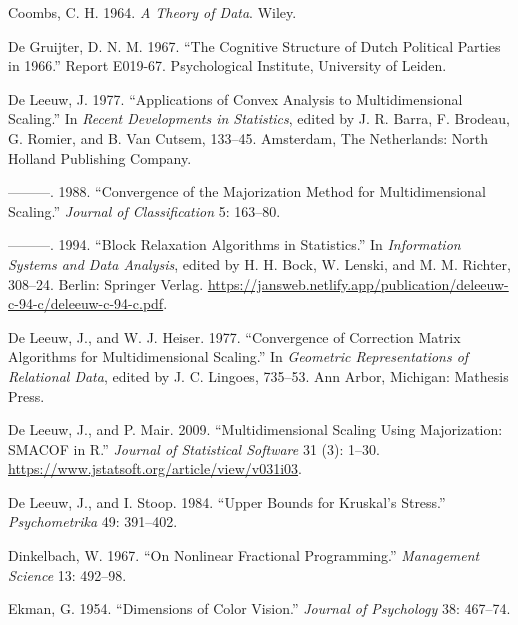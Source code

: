 \documentclass[
  12pt,
]{article}
\newlength{\cslhangindent}
\newenvironment{CSLReferences}[2] %
 {\begin{list}{}{%
  \setlength{\itemindent}{0pt}
  \setlength{\leftmargin}{0pt}
  \setlength{\parsep}{0pt}
  \ifodd #1
   \setlength{\leftmargin}{\cslhangindent}
   \setlength{\itemindent}{-1\cslhangindent}
  \fi
  \setlength{\itemsep}{#2\baselineskip}}}
 {\end{list}}
\theoremstyle{definition}
\theoremstyle{definition}
\theoremstyle{definition}
\theoremstyle{definition}
\theoremstyle{remark}
\begin{document}
\label{refs}
\begin{CSLReferences}{1}{0}
Coombs, C. H. 1964. \emph{{A Theory of Data}}. Wiley.

De Gruijter, D. N. M. 1967. {``{The Cognitive Structure of Dutch Political Parties in 1966}.''} Report E019-67. Psychological Institute, University of Leiden.

De Leeuw, J. 1977. {``Applications of Convex Analysis to Multidimensional Scaling.''} In \emph{Recent Developments in Statistics}, edited by J. R. Barra, F. Brodeau, G. Romier, and B. Van Cutsem, 133--45. Amsterdam, The Netherlands: North Holland Publishing Company.

---------. 1988. {``Convergence of the Majorization Method for Multidimensional Scaling.''} \emph{Journal of Classification} 5: 163--80.

---------. 1994. {``{Block Relaxation Algorithms in Statistics}.''} In \emph{Information Systems and Data Analysis}, edited by H. H. Bock, W. Lenski, and M. M. Richter, 308--24. Berlin: Springer Verlag. \url{https://jansweb.netlify.app/publication/deleeuw-c-94-c/deleeuw-c-94-c.pdf}.

De Leeuw, J., and W. J. Heiser. 1977. {``Convergence of Correction Matrix Algorithms for Multidimensional Scaling.''} In \emph{Geometric Representations of Relational Data}, edited by J. C. Lingoes, 735--53. Ann Arbor, Michigan: Mathesis Press.

De Leeuw, J., and P. Mair. 2009. {``{Multidimensional Scaling Using Majorization: SMACOF in R}.''} \emph{Journal of Statistical Software} 31 (3): 1--30. \url{https://www.jstatsoft.org/article/view/v031i03}.

De Leeuw, J., and I. Stoop. 1984. {``Upper Bounds for Kruskal's Stress.''} \emph{Psychometrika} 49: 391--402.

Dinkelbach, W. 1967. {``{On Nonlinear Fractional Programming}.''} \emph{Management Science} 13: 492--98.

Ekman, G. 1954. {``{Dimensions of Color Vision}.''} \emph{Journal of Psychology} 38: 467--74.


\end{CSLReferences}
\end{document}
